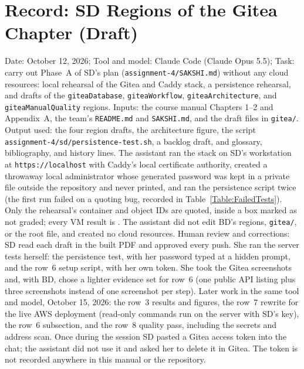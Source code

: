 \section{Record: SD Regions of the Gitea Chapter (Draft)}
Date: October 12, 2026; Tool and model: Claude Code (Claude Opus 5.5);
Task: carry out Phase~A of SD's plan (\texttt{assignment-4/SAKSHI.md}) without
any cloud resources: local rehearsal of the Gitea and Caddy stack, a
persistence rehearsal, and drafts of the \texttt{giteaDatabase},
\texttt{giteaWorkflow}, \texttt{giteaArchitecture}, and
\texttt{giteaManualQuality} regions. Inputs: the course manual
\cite{DosManual} Chapters 1--2 and Appendix~A, the team's
\texttt{README.md} and \texttt{SAKSHI.md}, and the draft files in
\texttt{gitea/}. Output used: the four region drafts, the architecture
figure, the script \texttt{assignment-4/sd/persistence-test.sh}, a backlog
draft, and glossary, bibliography, and history lines. The assistant ran the
stack on SD's workstation at \texttt{https://localhost} with Caddy's local
certificate authority, created a throwaway local administrator whose generated
password was kept in a private file outside the repository and never printed,
and ran the persistence script twice (the first run failed on a quoting bug,
recorded in Table~\ref{Table:FailedTests}). Only the rehearsal's container and
object IDs are quoted, inside a box marked as not graded; every VM result is
\StatusPending. The assistant did not edit BD's regions, \texttt{gitea/}, or
the root file, and created no cloud resources. Human review and corrections:
SD read each draft in the built PDF and approved every push. She ran the
server tests herself: the persistence test, with her password typed at a
hidden prompt, and the row~6 setup script, with her own token. She took
the Gitea screenshots and, with BD, chose a lighter evidence set for row~6
(one public API listing plus three screenshots instead of one screenshot
per step). Later work in the same tool and model, October 15, 2026: the
row~3 results and figures, the row~7 rewrite for the live AWS deployment
(read-only commands run on the server with SD's key), the row~6
subsection, and the row~8 quality pass, including the secrets and address
scan. Once during the session SD pasted a Gitea access token into the chat;
the assistant did not use it and asked her to delete it in Gitea. The token
is not recorded anywhere in this manual or the repository.

